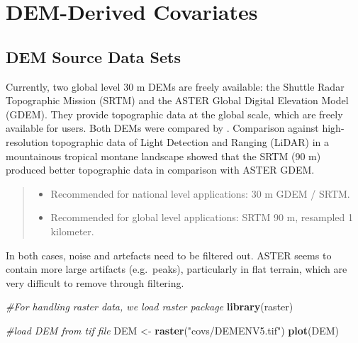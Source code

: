 \documentclass[10pt,b5paper,]{book}
\newenvironment{Shaded}{\begin{snugshade}}{\end{snugshade}}
\newcommand{\CommentTok}[1]{\textcolor[rgb]{0.56,0.35,0.01}{\textit{#1}}}
\newcommand{\KeywordTok}[1]{\textcolor[rgb]{0.13,0.29,0.53}{\textbf{#1}}}
\newcommand{\NormalTok}[1]{#1}
\newcommand{\StringTok}[1]{\textcolor[rgb]{0.31,0.60,0.02}{#1}}
\providecommand{\tightlist}{%
  \setlength{\itemsep}{0pt}\setlength{\parskip}{0pt}}
\theoremstyle{definition}
\theoremstyle{definition}
\theoremstyle{definition}
\theoremstyle{remark}
\begin{document}
\hypertarget{dem-derived-covariates}{%
\section{DEM-Derived Covariates}\label{dem-derived-covariates}}

\hypertarget{dem-source-data-sets}{%
\subsection{DEM Source Data Sets}\label{dem-source-data-sets}}

Currently, two global level 30 m DEMs are freely available: the Shuttle
Radar Topographic Mission (SRTM) and the ASTER Global Digital Elevation
Model (GDEM). They provide topographic data at the global scale, which
are freely available for users. Both DEMs were compared by
\citet{Wong2014}. Comparison against high-resolution topographic data of
Light Detection and Ranging (LiDAR) in a mountainous tropical montane
landscape showed that the SRTM (90 m) produced better topographic data
in comparison with ASTER GDEM.

\begin{quote}
\begin{itemize}
\tightlist
\item
  Recommended for national level applications: 30 m GDEM / SRTM.
\item
  Recommended for global level applications: SRTM 90 m, resampled 1
  kilometer.
\end{itemize}
\end{quote}

In both cases, noise and artefacts need to be filtered out. ASTER seems
to contain more large artifacts (e.g.~peaks), particularly in flat
terrain, which are very difficult to remove through filtering.

\begin{Shaded}
\begin{Highlighting}[]
\CommentTok{#For handling raster data, we load raster package}
\KeywordTok{library}\NormalTok{(raster)}

\CommentTok{#load DEM from tif file}
\NormalTok{DEM <-}\StringTok{ }\KeywordTok{raster}\NormalTok{(}\StringTok{"covs/DEMENV5.tif"}\NormalTok{)}
\KeywordTok{plot}\NormalTok{(DEM)}
\end{Highlighting}
\end{Shaded}
\end{document}
